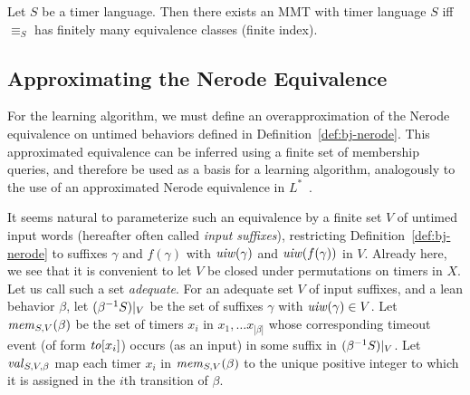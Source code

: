 \begin{theorem}
  \label{thm:bj-nerode}
Let $S$ be a timer language.
Then there exists an MMT with timer language $S$ iff 
$\equiv_S$ has finitely many equivalence classes (finite index).
\end{theorem}


\subsection{Approximating the Nerode Equivalence}
\label{sec:approx}

For the learning algorithm, we must define an overapproximation
of the Nerode equivalence on untimed behaviors
defined in Definition~\ref{def:bj-nerode}. This
approximated equivalence can be inferred using a finite set of membership
queries, and therefore be used as a basis for a learning algorithm,
analogously to the use of an approximated Nerode equivalence in
$L^*$~\cite{Ang87}.

It seems natural to parameterize such an equivalence by
a finite set $V$ of untimed input words (hereafter often
called {\em input suffixes}), restricting Definition~\ref{def:bj-nerode}
to suffixes $\gamma$ and $f(\gamma)$ with
$\mathit{uiw}(\gamma)$ and $\mathit{uiw}(f(\gamma))$ in $V$.
Already here, we see that it is convenient to 
let $V$ be closed under permutations
on timers in $X$. Let us call such a set {\em adequate}.
For an adequate set $V$ of input suffixes, and a lean behavior $\beta$,
let $({\beta}^{-1}{S})|_{V}$ be the set of suffixes $\gamma$
with $\mathit{uiw}(\gamma) \in V$.
Let $\mathit{mem}_{S,V}(\beta)$ be the set of timers $x_i$ in
$x_1 , \ldots x_{|\beta|}$ whose corresponding timeout event
(of form $\mathit{to}[x_i]$) occurs (as an input) in some suffix in
$({\beta}^{-1}{S})|_{V}$.
Let $\mathit{val}_{S,V,\beta}$ map each timer $x_i$ in
$\mathit{mem}_{S,V}(\beta)$ to the unique positive integer to which it
is assigned in the $i$th transition of $\beta$.


